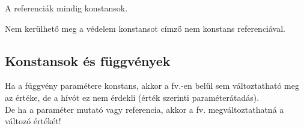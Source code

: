 \documentclass[usenames,dvipsnames,aspectratio=169]{beamer}
\begin{document}
\begin{frame}
    A referenciák mindig konstansok.
    \begin{exampleblock}{}
        \scriptsize
        
    \end{exampleblock}
    \vfill
    Nem kerülhető meg a védelem konstansot címző nem konstans referenciával.
    \begin{exampleblock}{}
        \tiny
        
    \end{exampleblock}
\end{frame}

\subsection{Konstansok és függvények}

\begin{frame}
    Ha a függvény paramétere konstans, akkor a fv.-en belül sem változtatható meg az értéke, de a hívót ez nem érdekli (érték szerinti paraméterátadás). \\
    De ha a paraméter mutató vagy referencia, akkor a fv. megváltoztathatná a változó értékét!
    \begin{exampleblock}{}
        \small
        
    \end{exampleblock}
\end{frame}

\begin{frame}
    \begin{exampleblock}{}
        \scriptsize
        
        
    \end{exampleblock}
\end{frame}
\end{document}
